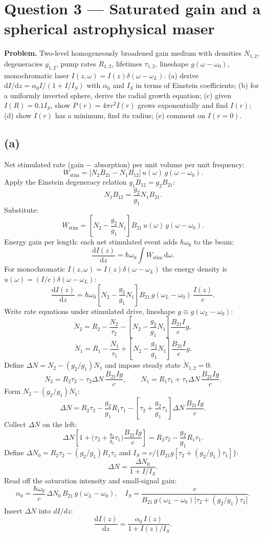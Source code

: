 \documentclass[11pt]{article}
\newcommand{\de}{\mathrm{d}}
\begin{document}
\section*{Question 3 --- Saturated gain and a spherical astrophysical maser}

\textbf{Problem.} Two-level homogeneously broadened gain medium with densities $N_{1,2}$, degeneracies $g_{1,2}$, pump rates $R_{1,2}$, lifetimes $\tau_{1,2}$, lineshape $g(\omega-\omega_0)$, monochromatic laser $I(z,\omega)=I(z)\delta(\omega-\omega_L)$. (a) derive $\de I/\de z=\alpha_0 I/(1+I/I_S)$ with $\alpha_0$ and $I_S$ in terms of Einstein coefficients; (b) for a uniformly inverted sphere, derive the radial growth equation; (c) given $I(R)=0.1 I_S$, show $P(r)=4\pi r^2 I(r)$ grows exponentially and find $I(r)$; (d) show $I(r)$ has a minimum, find its radius; (e) comment on $I(r=0)$.

\subsection*{(a)}

Net stimulated rate (gain $-$ absorption) per unit volume per unit frequency:
\[
W_\text{stim}=\bigl[N_2 B_{21}-N_1 B_{12}\bigr]\,u(\omega)\,g(\omega-\omega_0).
\]
Apply the Einstein degeneracy relation $g_1 B_{12}=g_2 B_{21}$:
\[
N_1 B_{12}=\frac{g_2}{g_1}N_1 B_{21}.
\]
Substitute:
\[
W_\text{stim}=\!\left[N_2-\frac{g_2}{g_1}N_1\right]B_{21}\,u(\omega)\,g(\omega-\omega_0).
\]
Energy gain per length: each net stimulated event adds $\hbar\omega_0$ to the beam:
\[
\frac{\de I(z)}{\de z}=\hbar\omega_0\!\int W_\text{stim}\,\de\omega.
\]
For monochromatic $I(z,\omega)=I(z)\delta(\omega-\omega_L)$ the energy density is $u(\omega)=(I/c)\delta(\omega-\omega_L)$:
\[
\frac{\de I(z)}{\de z}=\hbar\omega_0\!\left[N_2-\frac{g_2}{g_1}N_1\right]B_{21}\,g(\omega_L-\omega_0)\,\frac{I(z)}{c}.
\]
Write rate equations under stimulated drive, lineshape $g\equiv g(\omega_L-\omega_0)$:
\[
\dot N_2=R_2-\frac{N_2}{\tau_2}-\!\left[N_2-\frac{g_2}{g_1}N_1\right]\frac{B_{21}I}{c}g,
\]
\[
\dot N_1=R_1-\frac{N_1}{\tau_1}+\!\left[N_2-\frac{g_2}{g_1}N_1\right]\frac{B_{21}I}{c}g.
\]
Define $\Delta N=N_2-(g_2/g_1)N_1$ and impose steady state $\dot N_{1,2}=0$:
\[
N_2=R_2\tau_2-\tau_2\Delta N\,\frac{B_{21}Ig}{c},\qquad N_1=R_1\tau_1+\tau_1\Delta N\,\frac{B_{21}Ig}{c}.
\]
Form $N_2-(g_2/g_1)N_1$:
\[
\Delta N=R_2\tau_2-\frac{g_2}{g_1}R_1\tau_1-\!\left[\tau_2+\frac{g_2}{g_1}\tau_1\right]\Delta N\,\frac{B_{21}Ig}{c}.
\]
Collect $\Delta N$ on the left:
\[
\Delta N\!\left[1+\bigl(\tau_2+\tfrac{g_2}{g_1}\tau_1\bigr)\frac{B_{21}Ig}{c}\right]=R_2\tau_2-\frac{g_2}{g_1}R_1\tau_1.
\]
Define $\Delta N_0=R_2\tau_2-(g_2/g_1)R_1\tau_1$ and $I_S=c/\{B_{21}g[\tau_2+(g_2/g_1)\tau_1]\}$:
\[
\Delta N=\frac{\Delta N_0}{1+I/I_S}.
\]
Read off the saturation intensity and small-signal gain:
\[
\boxed{\;
\alpha_0=\frac{\hbar\omega_0}{c}\,\Delta N_0\,B_{21}\,g(\omega_L-\omega_0),\quad
I_S=\frac{c}{B_{21}\,g(\omega_L-\omega_0)\bigl[\tau_2+(g_2/g_1)\tau_1\bigr]}.\;}
\]
Insert $\Delta N$ into $dI/dz$:
\[
\boxed{\;\frac{\de I(z)}{\de z}=\frac{\alpha_0\,I(z)}{1+I(z)/I_S}.\;}
\]
\end{document}
